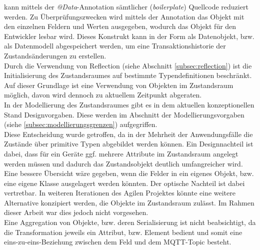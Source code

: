     kann mittels der \textit{@Data}-Annotation sämtlicher (\textit{boilerplate}) Quellcode reduziert werden. Zu Überprüfungszwecken wird mittels der Annotation das Objekt mit den einzelnen 
    Feldern und Werten ausgegeben, wodurch das Objekt für den Entwickler lesbar wird. Dieses Konstrukt kann in der Form als Datenobjekt, bzw. als Datenmodell abgespeichert werden, um eine 
    Transaktionshistorie der Zustandsänderungen zu erstellen.
    \\
    \linebreak
    Durch die Verwendung von Reflection (siehe Abschnitt \ref{subsec:reflection}) ist die Initialisierung des Zustandsraumes auf bestimmte Typendefinitionen beschränkt. 
    Auf dieser Grundlage ist eine Verwendung von Objekten im Zustandsraum möglich, davon wird dennoch zu aktuellem Zeitpunkt abgeraten. 
    \\
    In der Modellierung des Zustandsraumes gibt es in dem aktuellen konzeptionellen Stand Designvorgaben. Diese werden im Abschnitt der 
    Modellierungsvorgaben (siehe \ref{subsec:modellierungsgrenzen}) aufgegriffen. 
    \\ 
    Diese Entscheidung wurde getroffen, da in der Mehrheit der Anwendungsfälle die Zustände über primitive Typen abgebildet werden können. 
    Ein Designnachteil ist dabei, dass für ein Geräte ggf. mehrere Attribute im Zustandsraum angelegt werden müssen und dadurch das Zustandsobjekt 
    deutlich umfangreicher wird. Eine bessere Übersicht wäre gegeben, wenn die Felder in ein eigenes Objekt, bzw. eine eigene Klasse ausgelagert werden könnten. 
    Der optische Nachteil ist dabei vertretbar. In weiteren Iterationen des Agilen Projektes könnte eine weitere Alternative konzipiert werden, die Objekte 
    im Zustandsraum zulässt. Im Rahmen dieser Arbeit war dies jedoch nicht vorgesehen.
    \\
    Eine Aggregation von Objekte, bzw. deren Serialisierung ist nicht beabsichtigt, da die Transformation jeweils ein Attribut, bzw. Element bedient und somit eine 
    eins-zu-eins-Beziehung zwischen dem Feld und dem \acs{MQTT}-Topic besteht. 

